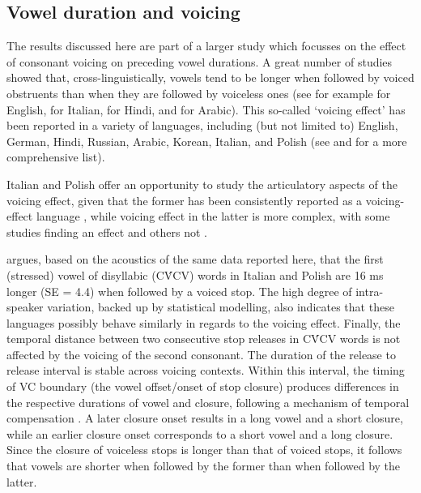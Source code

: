 \documentclass[preprint]{JASAnew}
\begin{document}
\hypertarget{vowel-duration-and-voicing}{%
\subsection{Vowel duration and
voicing}\label{vowel-duration-and-voicing}}

The results discussed here are part of a larger study which focusses on
the effect of consonant voicing on preceding vowel durations. A great
number of studies showed that, cross-linguistically, vowels tend to be
longer when followed by voiced obstruents than when they are followed by
voiceless ones (see for example
\citealt{house1953, peterson1960, chen1970, klatt1973, lisker1974, fowler1992}
for English, \citealt{farnetani1986, esposito2002} for Italian,
\citealt{lampp2004, durvasula2012} for Hindi, and \citealt{hussein1994}
for Arabic). This so-called `voicing effect' has been reported in a
variety of languages, including (but not limited to) English, German,
Hindi, Russian, Arabic, Korean, Italian, and Polish (see
\citealt{maddieson1976} and \citealt{begus2017} for a more comprehensive
list).

Italian and Polish offer an opportunity to study the articulatory
aspects of the voicing effect, given that the former has been
consistently reported as a voicing-effect language
\citep{caldognetto1979, farnetani1986, esposito2002}, while voicing
effect in the latter is more complex, with some studies finding an
effect \citep{slowiaczek1985, nowak2006, malisz2008, coretta2018j} and
others not \citep{keating1984, jassem1989}.

\citet{coretta2018j} argues, based on the acoustics of the same data
reported here, that the first (stressed) vowel of disyllabic (CV́CV)
words in Italian and Polish are 16 ms longer (SE = 4.4) when followed by
a voiced stop. The high degree of intra-speaker variation, backed up by
statistical modelling, also indicates that these languages possibly
behave similarly in regards to the voicing effect. Finally, the temporal
distance between two consecutive stop releases in CV́CV words is not
affected by the voicing of the second consonant. The duration of the
release to release interval is stable across voicing contexts. Within
this interval, the timing of VC boundary (the vowel offset/onset of stop
closure) produces differences in the respective durations of vowel and
closure, following a mechanism of temporal compensation
\citep{lindblom1967, slis1969a, slis1969, lehiste1970, lehiste1970a}. A
later closure onset results in a long vowel and a short closure, while
an earlier closure onset corresponds to a short vowel and a long
closure. Since the closure of voiceless stops is longer than that of
voiced stops, it follows that vowels are shorter when followed by the
former than when followed by the latter.
\end{document}
